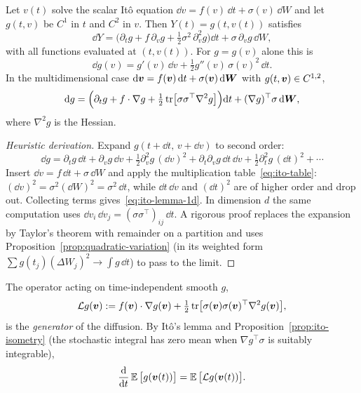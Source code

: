 \begin{theorem}[It\^o's Lemma]
\label{thm:ito-lemma}
Let $v(t)$ solve the scalar It\^o equation $\dd v=f(v)\,\dd t+\sigma(v)\,\dd W$ and let $g(t,v)$ be $C^1$ in $t$ and $C^2$ in $v$. Then $Y(t)=g(t,v(t))$ satisfies
\begin{equation}
\label{eq:ito-lemma-1d}
\dd Y=\Big(\partial_t g+f\,\partial_v g+\tfrac12\sigma^2\,\partial_v^2 g\Big)\dd t+\sigma\,\partial_v g\,\dd W,
\end{equation}
with all functions evaluated at $(t,v(t))$. For $g=g(v)$ alone this is
\[
\dd g(v)=g'(v)\,\dd v+\tfrac12 g''(v)\,\sigma(v)^2\,\dd t .
\]
In the multidimensional case $\mathrm{d}\bm{v}=f(\bm{v})\,\mathrm{d} t+\sigma(\bm{v})\,\mathrm{d}\bm{W}$ with $g(t,\bm{v})\in C^{1,2}$,
\begin{equation}
\label{eq:ito-lemma-nd}
\mathrm{d} g=\Big(\partial_t g+f\cdot\nabla g+\tfrac12\operatorname{tr}\!\big[\sigma\sigma^{\top}\nabla^2 g\big]\Big)\mathrm{d} t+(\nabla g)^{\top}\sigma\,\mathrm{d}\bm{W},
\end{equation}
where $\nabla^2 g$ is the Hessian.
\end{theorem}

\begin{proof}[Heuristic derivation]
Expand $g(t+\dd t,\,v+\dd v)$ to second order:
\[
\dd g=\partial_t g\,\dd t+\partial_v g\,\dd v+\tfrac12\partial_v^2 g\,(\dd v)^2+\partial_t\partial_v g\,\dd t\,\dd v+\tfrac12\partial_t^2 g\,(\dd t)^2+\cdots
\]
Insert $\dd v=f\,\dd t+\sigma\,\dd W$ and apply the multiplication table~\eqref{eq:ito-table}: $(\dd v)^2=\sigma^2(\dd W)^2=\sigma^2\,\dd t$, while $\dd t\,\dd v$ and $(\dd t)^2$ are of higher order and drop out. Collecting terms gives~\eqref{eq:ito-lemma-1d}. In dimension $d$ the same computation uses $\dd v_i\,\dd v_j=(\sigma\sigma^\top)_{ij}\,\dd t$. A rigorous proof replaces the expansion by Taylor's theorem with remainder on a partition and uses Proposition~\ref{prop:quadratic-variation} (in its weighted form $\sum g(t_j)(\Delta W_j)^2\to\int g\,\dd t$) to pass to the limit.
\end{proof}

\begin{definition}
\label{def:generator}
The operator acting on time-independent smooth $g$,
\[
\mathcal L g(\bm{v}):=f(\bm{v})\cdot\nabla g(\bm{v})+\tfrac12\operatorname{tr}\!\big[\sigma(\bm{v})\sigma(\bm{v})^{\top}\nabla^2g(\bm{v})\big],
\]
is the \emph{generator} of the diffusion. By It\^o's lemma and Proposition~\ref{prop:ito-isometry} (the stochastic integral has zero mean when $\nabla g^\top\sigma$ is suitably integrable),
\begin{equation}
\label{eq:dynkin}
\frac{\mathrm{d}}{\mathrm{d} t}\operatorname{\mathbb{E}}\big[g(\bm{v}(t))\big]=\operatorname{\mathbb{E}}\big[\mathcal Lg(\bm{v}(t))\big].
\end{equation}
\end{definition}


